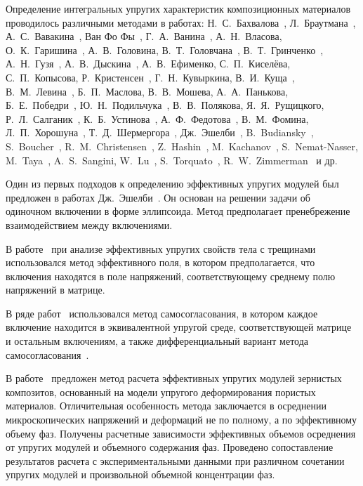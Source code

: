 Определение интегральных упругих характеристик композиционных материалов проводилось различными методами в работах: Н.~С.~Бахвалова~\cite{Bahvalov}, Л.~Браутмана~\cite{Brautman}, А.~С.~Вавакина~\cite{Vavakin}, Ван Фо Фы~\cite{VanFoFiKo1971, VanFoFi1971}, Г.~А.~Ванина~\cite{Vanin1985, Vanin1994, Vanin1976, Vanin1980, Vanin1977}, А.~Н.~Власова, О.~К.~Гаришина~\cite{Garishin}, А.~В.~Головина, В.~Т.~Головчана~\cite{Golovchan1974, Golovchan1993, Golovchan1987, Golovchan2000}, В.~Т.~Гринченко~\cite{Grinchenko1965, Grinchenko1967, Grinchenko1985, Grinchenko1978}, А.~Н.~Гузя~\cite{Guz1968}, А.~В.~Дыскина~\cite{Diskin}, А.~В.~Ефименко, С.~П.~Киселёва, С.~П.~Копысова, Р.~Кристенсен~\cite{Kristensen}, Г.~Н.~Кувыркина, В.~И.~Куща~\cite{Kusch1995}, В.~М.~Левина~\cite{Levin}, Б.~П.~Маслова, В.~В.~Мошева, А.~А.~Панькова, Б.~Е.~Победри~\cite{Pobedrya}, Ю.~Н.~Подильчука~\cite{Podilchuk1967, Podilchuk1984}, В.~В.~Полякова, Я.~Я.~Рущицкого, Р.~Л.~Салганик~\cite{Salganik}, К.~Б.~Устинова~\cite{Ustinov}, А.~Ф.~Федотова~\cite{Fedotov}, В.~М.~Фомина, Л.~П.~Хорошуна~\cite{Khoroshun, Khoroshun2000-1, Khoroshun2000-2}, Т.~Д.~Шермергора~\cite{Schermergor}, Дж.~Эшелби~\cite{Eshelbi, Eshelby}, B.~Budiansky~\cite{Budiansky}, S.~Boucher~\cite{Boucher}, R.~M.~Christensen~\cite{Christensen, Christensen1990}, Z.~Hashin~\cite{Hashin, Hashin1983, Hashin1988, Hashin1963}, M.~Kachanov~\cite{Kachanov}, S.~Nemat-Nasser, M.~Taya~\cite{Nemat-Nasser}, A.~S.~Sangini, W.~Lu~\cite{Sangini}, S.~Torquato~\cite{Torquato}, R.~W.~Zimmerman~\cite{Zimmerman} и др.{\sloppy\par}

Один из первых подходов к определению эффективных упругих модулей был предложен в работах Дж.~Эшелби~\cite{Eshelbi, Eshelby}. Он основан на решении задачи об одиночном включении в форме эллипсоида. Метод предполагает пренебрежение взаимодействием между включениями.

В работе~\cite{Kachanov} при анализе эффективных упругих свойств тела с трещинами использовался метод эффективного поля, в котором предполагается, что включения находятся в поле напряжений, соответствующему среднему полю напряжений в матрице.

В ряде работ~\cite{Christensen1990} использовался метод самосогласования, в котором каждое включение находится в эквивалентной упругой среде, соответствующей матрице и остальным включениям, а также дифференциальный вариант метода самосогласования~\cite{Salganik, Vavakin, Zimmerman}.

В работе~\cite{Fedotov} предложен метод расчета эффективных упругих модулей зернистых композитов, основанный на модели упругого деформирования пористых материалов. Отличительная особенность метода заключается в осреднении микроскопических напряжений и деформаций не по полному, а по эффективному объему фаз. Получены расчетные зависимости эффективных объемов осреднения от упругих модулей и объемного содержания фаз. Проведено сопоставление результатов расчета с экспериментальными данными при различном сочетании упругих модулей и произвольной объемной концентрации фаз.

